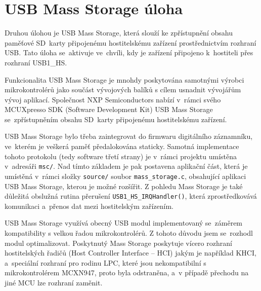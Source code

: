 
\section{USB Mass Storage úloha}
Druhou úlohou je USB Mass Storage, která slouží ke zpřístupnění obsahu paměťové SD~karty připojenému hostitelskému zařízení prostřednictvím rozhraní USB. Tato úloha se~aktivuje ve~chvíli, kdy je zařízení připojeno k~hostiteli přes rozhraní USB1\_HS.


Funkcionalita USB Mass Storage je mnohdy poskytována samotnými výrobci mikrokontrolérů jako součást vývojových balíků s cílem usnadnit vývojářům vývoj aplikací. Společnost NXP Semiconductors nabízí v~rámci svého MCUXpresso SDK (Software Development Kit) USB Mass Storage se~zpřístupněním obsahu SD~karty připojenému hostitelskému zařízení.~\cite{NXP_SDK}

USB Mass Storage bylo třeba zaintegrovat do firmwaru digitálního záznamníku, ve~kterém je veškerá paměť předalokována staticky. Samotná implementace tohoto protokolu (tedy software třetí strany) je v~rámci projektu umístěna v~adresáři \texttt{msc/}. Nad tímto základem je pak postavena aplikační část, která je umístěná v~rámci složky \texttt{source/} soubor \texttt{mass\_storage.c}, obsahující aplikaci USB Mass Storage, kterou je možné rozšířit. Z pohledu Mass Storage je také důležitá obslužná rutina přerušení \texttt{USB1\_HS\_IRQHandler()}, která zprostředkovává komunikaci a~přenos dat mezi hostitelským zařízením.

USB Mass Storage využívá obecný USB modul implementovaný se~záměrem kompatibility s velkou řadou mikrokontrolérů. Z tohoto důvodu jsem se~rozhodl modul optimalizovat. Poskytnutý Mass Storage poskytuje vícero rozhraní hostitelských řadičů (Host Controller Interface -- HCI) jakým je například KHCI, a~speciální rozhraní pro rodinu LPC, které jsou nekompatibilní s mikrokontrolérem MCXN947, proto byla odstraněna, a~v případě přechodu na jiné MCU lze rozhraní zaměnit. 



